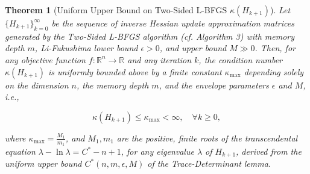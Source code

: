 \documentclass[10pt,a4paper]{amsart}
\newtheorem{theorem}{Theorem}
\begin{document}
\begin{theorem}[Uniform Upper Bound on Two-Sided L-BFGS $\kappa(H_{k+1})$]
Let \(\{H_{k+1}\}_{k=0}^{\infty}\) be the sequence of inverse Hessian update approximation matrices generated by the Two-Sided L-BFGS algorithm (cf. Algorithm 3) with memory depth $m$, Li-Fukushima lower bound $\epsilon > 0$, and upper bound $M \gg 0$. Then, for any objective function \(f: \mathbb{R}^n \to \mathbb{R}\) and any iteration $k$, the condition number \(\kappa(H_{k+1})\) is uniformly bounded above by a finite constant \(\kappa _{\max }\) depending solely on the dimension \(n\), the memory depth \(m\), and the envelope parameters \(\epsilon \) and \(M\), i.e., 

\begin{equation} \kappa(H_{k+1}) \leq \kappa_{\max} < \infty, \quad \forall k \geq 0, 
\end{equation}

\noindent
where \(\kappa_{\max} = \frac{M_1}{m_1}\), and \(M_1, m_1\) are the positive, finite roots of the transcendental equation \(\lambda - \ln \lambda = C^*-n+1\), for any eigenvalue $\lambda$ of $H_{k+1}$, derived from the uniform upper bound \(C^*(n, m, \epsilon, M)\) of the Trace-Determinant lemma.
\end{theorem}
\end{document}
